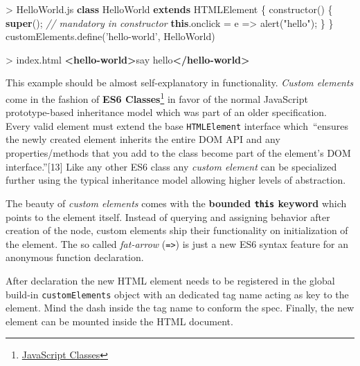 \documentclass[]{article}
\newenvironment{Shaded}{}{}
\newcommand{\KeywordTok}[1]{\textcolor[rgb]{0.00,0.44,0.13}{\textbf{{#1}}}}
\newcommand{\StringTok}[1]{\textcolor[rgb]{0.25,0.44,0.63}{{#1}}}
\newcommand{\CommentTok}[1]{\textcolor[rgb]{0.38,0.63,0.69}{\textit{{#1}}}}
\newcommand{\VariableTok}[1]{\textcolor[rgb]{0.10,0.09,0.49}{{#1}}}
\newcommand{\OperatorTok}[1]{\textcolor[rgb]{0.40,0.40,0.40}{{#1}}}
\newcommand{\AttributeTok}[1]{\textcolor[rgb]{0.49,0.56,0.16}{{#1}}}
\newcommand{\NormalTok}[1]{{#1}}
\begin{document}
\begin{Shaded}
\begin{Highlighting}[]
\OperatorTok{>} \VariableTok{HelloWorld}\NormalTok{.}\AttributeTok{js}
\KeywordTok{class} \NormalTok{HelloWorld }\KeywordTok{extends} \NormalTok{HTMLElement }\OperatorTok{\{}
 \AttributeTok{constructor}\NormalTok{() }\OperatorTok{\{}
  \KeywordTok{super}\NormalTok{()}\OperatorTok{;} \CommentTok{// mandatory in constructor}
  \KeywordTok{this}\NormalTok{.}\AttributeTok{onclick} \OperatorTok{=} \NormalTok{e }\OperatorTok{=>} \AttributeTok{alert}\NormalTok{(}\StringTok{"hello"}\NormalTok{)}\OperatorTok{;}
 \OperatorTok{\}}
\OperatorTok{\}}
\VariableTok{customElements}\NormalTok{.}\AttributeTok{define}\NormalTok{(}\StringTok{'hello-world'}\OperatorTok{,} \NormalTok{HelloWorld)}
\end{Highlighting}
\end{Shaded}

\begin{Shaded}
\begin{Highlighting}[]
\NormalTok{> index.html}
\KeywordTok{<hello-world>}\NormalTok{say hello}\KeywordTok{</hello-world>}
\end{Highlighting}
\end{Shaded}

This example should be almost self-explanatory in functionality.
\emph{Custom elements} come in the fashion of \textbf{ES6
Classes}\footnote{\href{https://developer.mozilla.org/en/docs/Web/JavaScript/Reference/Classes}{JavaScript
  Classes}} in favor of the normal JavaScript prototype-based
inheritance model which was part of an older specification. Every valid
element must extend the base \texttt{HTMLElement} interface
which~``ensures the newly created element inherits the entire DOM API
and any properties/methods that you add to the class become part of the
element's DOM interface.''{[}13{]} Like any other ES6 class any
\emph{custom element} can be specialized further using the typical
inheritance model allowing higher levels of abstraction.

The beauty of \emph{custom elements} comes with the \textbf{bounded
\texttt{this} keyword} which points to the element itself. Instead of
querying and assigning behavior after creation of the node, custom
elements ship their functionality on initialization of the element. The
so called \emph{fat-arrow} (\texttt{=\textgreater{}}) is just a new ES6
syntax feature for an anonymous function declaration.

After declaration the new HTML element needs to be registered in the
global build-in \texttt{customElements} object with an dedicated tag
name acting as key to the element. Mind the dash inside the tag name to
conform the spec. Finally, the new element can be mounted inside the
HTML document.
\end{document}
